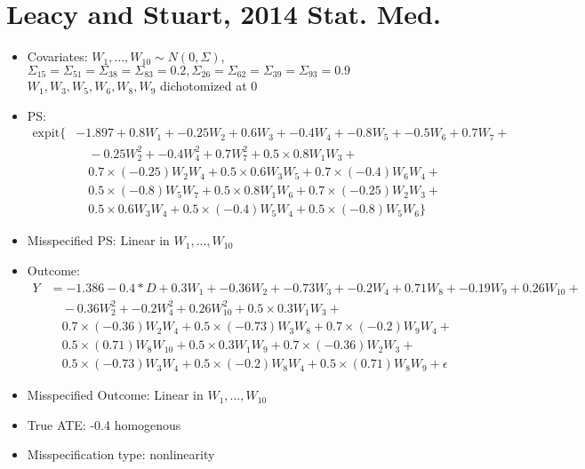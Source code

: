 \documentclass{article}
\begin{document}
\section{Leacy and Stuart, 2014 Stat. Med. \cite{Leacy2014}}
\begin{itemize}
\item Covariates: $W_1, \ldots, W_{10} \sim N(0,\Sigma)$, $\Sigma_{15} = \Sigma_{51} = \Sigma_{38} = \Sigma_{83} = 0.2, \Sigma_{26} = \Sigma_{62} = \Sigma_{39} = \Sigma_{93} = 0.9$  \\  $W_1, W_3, W_5, W_6, W_8, W_9$ dichotomized at 0
\item PS: \begin{align*}
\text{expit}\{&-1.897 + 0.8W_1 + -0.25W_2 + 0.6W_3 + -0.4W_4 + -0.8W_5 + -0.5W_6 + 0.7W_7 +\\
              &\quad-0.25W_2^2 + -0.4W_4^2 + 0.7W_7^2 + 0.5 \times0.8W_1W_3 +\\
               &\quad0.7 \times(-0.25)W_2W_4 + 0.5 \times0.6W_3W_5 + 0.7 \times(-0.4)W_6W_4 +\\
               &\quad0.5 \times(-0.8)W_5W_7 + 0.5 \times0.8W_1W_6 + 0.7 \times(-0.25)W_2W_3 +\\
               &\quad0.5 \times0.6W_3W_4 + 0.5 \times(-0.4)W_5W_4 + 0.5 \times(-0.8)W_5W_6\}
               \end{align*}
\item Misspecified PS: Linear in $W_1, ..., W_{10}$
\item Outcome: 
\begin{align*}
Y &= -1.386 - 0.4*D + 0.3W_1 + -0.36W_2 + -0.73W_3 + -0.2W_4 + 0.71W_8 + -0.19W_9 + 0.26W_10 +\\
              &\quad-0.36W_2^2 + -0.2W_4^2 + 0.26W_{10}^2 + 0.5 \times0.3W_1W_3 +\\
               &\quad0.7 \times(-0.36)W_2W_4 + 0.5 \times(-0.73)W_3W_8 + 0.7 \times(-0.2)W_9W_4 +\\
               &\quad0.5 \times(0.71)W_8W_{10} + 0.5 \times0.3W_1W_9 + 0.7 \times(-0.36)W_2W_3 +\\
               &\quad0.5 \times(-0.73)W_3W_4 + 0.5 \times(-0.2)W_8W_4 + 0.5 \times(0.71)W_8W_9 + \epsilon
\end{align*}
\item Misspecified Outcome: Linear in $W_1, ..., W_{10}$
\item True ATE: -0.4 homogenous
\item Misspecification type: nonlinearity
\end{itemize}



\end{document}
